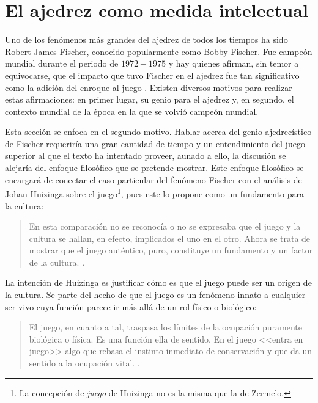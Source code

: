 \documentclass[twoside,openright,12pt,a4paper,spanish]{book}
\begin{document}
\section{El ajedrez como medida intelectual}

\noindent Uno de los fen\'omenos m\'as grandes del ajedrez de todos los tiempos ha sido Robert James Fischer, conocido popularmente como Bobby Fischer. Fue campe\'on mundial durante el periodo de $1972 - 1975$ y hay quienes afirman, sin temor a equivocarse, que el impacto que tuvo Fischer en el ajedrez fue tan significativo como la adici\'on del enroque al juego \cite[p. 219]{golombek1976history}. Existen diversos motivos para realizar estas afirmaciones: en primer lugar, su genio para el ajedrez y, en segundo, el contexto mundial de la \'epoca en la que se volvi\'o campe\'on mundial.

Esta secci\'on se enfoca en el segundo motivo. Hablar acerca del genio ajedrec\'istico de Fischer requerir\'ia una gran cantidad de tiempo y un entendimiento del juego superior al que el texto ha intentado proveer, aunado a ello, la discusi\'on se alejar\'ia del enfoque filos\'ofico que se pretende mostrar. Este enfoque filos\'ofico se encargar\'a de conectar el caso particular del fenómeno Fischer con el an\'alisis de Johan Huizinga sobre el juego\footnote{La concepci\'on de \emph{juego} de Huizinga no es la misma que la de Zermelo.}, pues este lo propone como un fundamento para la cultura: 

\begin{quote}\singlespacing
En esta comparaci\'on no se reconoc\'ia o no se expresaba que el juego y la cultura se hallan, en efecto, implicados el uno en el otro. Ahora se trata de mostrar que el juego aut\'entico, puro, constituye un fundamento y un factor de la cultura. \cite[p. 17]{huizinga2020homo}.
\end{quote}

La intenci\'on de Huizinga es justificar c\'omo es que el juego puede ser un origen de la cultura. Se parte del hecho de que el juego es un fenómeno innato a cualquier ser vivo cuya funci\'on parece ir m\'as all\'a de un rol f\'isico o biol\'ogico: 

\begin{quote}\singlespacing
El juego, en cuanto a tal, traspasa los l\'imites de la ocupaci\'on puramente biol\'ogica o f\'isica. Es una funci\'on ella de sentido. En el juego <<entra en juego>> algo que rebasa el instinto inmediato de conservaci\'on y que da un sentido a la ocupaci\'on vital. \cite[p. 12]{huizinga2020homo}.
\end{quote}
\end{document}
